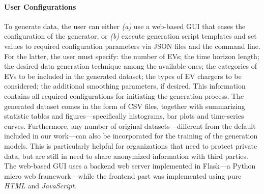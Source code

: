 \documentclass[sigconf]{acmart}
\begin{document}
\paragraph{User Configurations}
To generate data, the user can either {\em (a)} use a web-based GUI that eases the configuration of the generator, %
or {\em (b)} execute generation script templates and set
values to required configuration parameters via JSON files and the command line.
For the latter, %
the user must specify: the number of EVs; the time horizon length; 
     the desired data generation technique among the available ones;
    the categories of EVs to be included in the generated dataset;
    the types of EV chargers to be considered; the additional smoothing parameters, if desired.
This information contains all required configurations for initiating the generation process.
The generated dataset comes in the form of CSV files, 
together with summarizing statistic tables and figures---specifically histograms, bar plots and time-series curves.
Furthermore, any number of %
original datasets---different from the default 
included in our work---can also be incorporated for the training of the generation models. This is particularly helpful for organizations that need to protect private data, but are still in need to share anonymized information with third parties. 
The web-based GUI  uses a backend web server implemented in Flask---a Python micro web framework---while the frontend part was implemented using pure \emph{HTML} and \emph{JavaScript}. 
\end{document}
